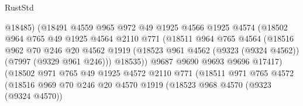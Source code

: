 \begin{lexlean}{RustStd}
\begin{coremodule}
{\begin{coremodule}
{{{{{{{{{{{{{{{{{{{{{{{{{{{{{{{{{{{{{{{{{{{                                @18485)
                              (@18491
                                @4559
                                @965
                                @972
                                @49
                                @1925
                                @4566
                                @1925
                                @4574
                                (@18502
                                  @964
                                  @765
                                  @49
                                  @1925
                                  @4564
                                  @2110
                                  @771
                                  (@18511
                                    @964
                                    @765
                                    @4564
                                    (@18516
                                      @962
                                      @70
                                      @246
                                      @20
                                      @4562
                                      @1919
                                      (@18523
                                        @961
                                        @4562
                                        (@9323 (@9324 @4562))
                                        (@7997 (@9329 @961 @246)))
                                      @18535))
                                  @9687
                                  @9690
                                  @9693
                                  @9696
                                  @17417)
                                (@18502
                                  @971
                                  @765
                                  @49
                                  @1925
                                  @4572
                                  @2110
                                  @771
                                  (@18511
                                    @971
                                    @765
                                    @4572
                                    (@18516
                                      @969
                                      @70
                                      @246
                                      @20
                                      @4570
                                      @1919
                                      (@18523
                                        @968
                                        @4570
                                        (@9323 (@9324 @4570))
}}}}}}}}}}}}}}}}}}}}}}}}}}}}}}}}}}}}}}}}}}}
\end{coremodule}}
\end{coremodule}
\end{lexlean}
